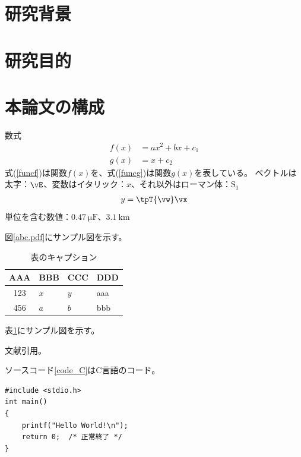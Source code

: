 \section{研究背景}
\section{研究目的}
\section{本論文の構成}
数式
\begin{align}
    f(x) &= ax^2+bx+c_1 %
    \label{funcf} %
    \\  %
    g(x) &= x+c_2
    \label{funcg}
\end{align}
式(\ref{funcf})は関数$f(x)$を、式(\ref{funcg})は関数$g(x)$を表している。
ベクトルは太字：$\vE$、変数はイタリック：$x$、それ以外はローマン体：$\mathrm{S}_1$
\begin{align}
    y = \tpT{\vw}\vx
\end{align}
単位を含む数値：$\SI{0.47}{\micro\farad}$、$\SI{3.1}{\kilo\metre}$
\par
図\ref{abc.pdf}にサンプル図を示す。

\begin{table}[htbp]
    \caption{表のキャプション}
    \label{table:tableSample}
    \centering
     \begin{tabular}{clll} %
      \hline
      AAA & BBB & CCC & DDD \\
      \hline
      123 & $x$ & $y$ & aaa \\
      456 & $a$ & $b$ & bbb \\
      \hline
     \end{tabular}
\end{table}
表\ref{table:tableSample}にサンプル図を示す。
\par
文献\cite{sugisaka2020lensless}引用。
\par
ソースコード\ref{code_C}はC言語のコード。
\begin{lstlisting}[caption={C言語},label={code_C}]
#include <stdio.h>
int main()
{
    printf("Hello World!\n");
    return 0;  /* 正常終了 */
}
\end{lstlisting}
